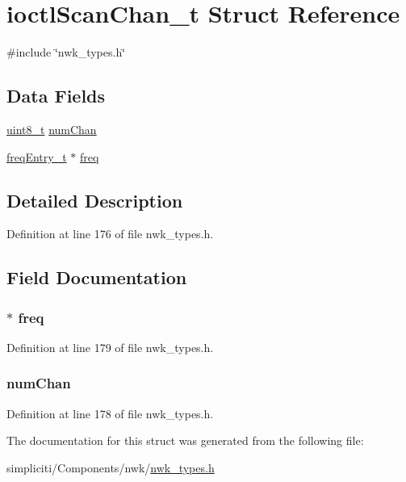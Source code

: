 \hypertarget{structioctlScanChan__t}{\section{ioctl\-Scan\-Chan\-\_\-t \-Struct \-Reference}
\label{structioctlScanChan__t}
}


{\ttfamily \#include \char`\"{}nwk\-\_\-types.\-h\char`\"{}}

\subsection*{\-Data \-Fields}
\begin{DoxyCompactItemize}
\item 
\hyperlink{bsp__msp430__defs_8h_aba7bc1797add20fe3efdf37ced1182c5}{uint8\-\_\-t} \hyperlink{structioctlScanChan__t_a44e556259f16f30607b7ca7dc8fc7ab9}{num\-Chan}
\item 
\hyperlink{structfreqEntry__t}{freq\-Entry\-\_\-t} $\ast$ \hyperlink{structioctlScanChan__t_af4f77f0a95a9ef3f8d76c23fcc8b9198}{freq}
\end{DoxyCompactItemize}


\subsection{\-Detailed \-Description}


\-Definition at line 176 of file nwk\-\_\-types.\-h.



\subsection{\-Field \-Documentation}
\hypertarget{structioctlScanChan__t_af4f77f0a95a9ef3f8d76c23fcc8b9198}{
\subsubsection[{freq}]{$\ast$ {\bf freq}}}\label{structioctlScanChan__t_af4f77f0a95a9ef3f8d76c23fcc8b9198}


\-Definition at line 179 of file nwk\-\_\-types.\-h.

\hypertarget{structioctlScanChan__t_a44e556259f16f30607b7ca7dc8fc7ab9}{
\subsubsection[{num\-Chan}]{ {\bf num\-Chan}}}\label{structioctlScanChan__t_a44e556259f16f30607b7ca7dc8fc7ab9}


\-Definition at line 178 of file nwk\-\_\-types.\-h.



\-The documentation for this struct was generated from the following file\-:\begin{DoxyCompactItemize}
\item 
simpliciti/\-Components/nwk/\hyperlink{nwk__types_8h}{nwk\-\_\-types.\-h}\end{DoxyCompactItemize}
